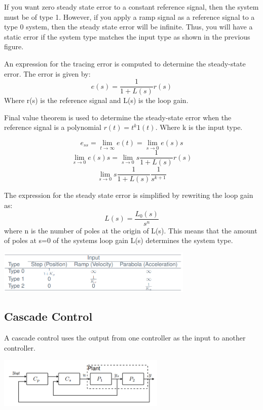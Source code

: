 If you want zero steady state error to a constant reference signal, then the system must be of type 1.
However, if you apply a ramp signal as a reference signal to a type 0 system, then the steady state error will be infinite.
Thus, you will have a static error if the system type matches the input type as shown in the previous figure.

An expression for the tracing error is computed to determine the steady-state error. The error is given by:
$$e(s) = \frac{1}{1+L(s)}r(s)$$
Where r(s) is the reference signal and L(s) is the loop gain.


Final value theorem is used to determine the steady-state error when
the reference signal is a polynomial $r(t) = t^k 1(t)$. Where k is the input type.

$$e_{ss} = \lim_{t \to \infty} e(t) = \lim_{s \to 0} e(s)s$$
$$\lim_{s \to 0} e(s)s = \lim_{s \to 0} s\frac{1}{1+L(s)}r(s)$$
$$\lim_{s \to 0} s\frac{1}{1+L(s)}\frac{1}{s^{k+1}}$$

The expression for the steady state error is simplified by rewriting the loop gain as:
$$L(s) = \frac{L_0(s)}{s^n}$$
where n is the number of poles at the origin of L(s). This means that the amount of poles at s=0 of the systems loop gain L(s) determines the system type.


\begin{center}
	\includegraphics[width=0.7\textwidth]{Images/ssTracking.png}
\end{center}


\subsection{Cascade Control}
A cascade control uses the output from one controller as the input to another controller.


\begin{center}
	\includegraphics[width=0.6\textwidth]{Images/cascade.png}
\end{center}

